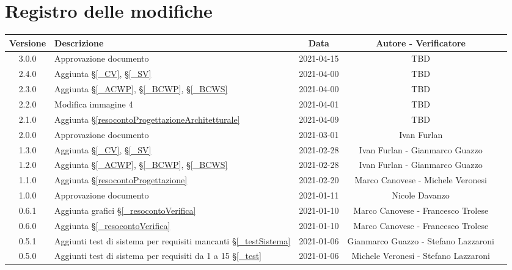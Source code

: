 \section*{Registro delle modifiche}

\begin{center}
	\begin{longtable}{|c|p{5cm}|c|c|c|}
	\hline
	\rowcolor{lighter-grayer}
	\textbf{Versione} & \textbf{Descrizione} & \textbf{Data} & \textbf{Autore - Verificatore} \\
	\hline
	\endfirsthead


	\hline
	3.0.0 & Approvazione documento & 2021-04-15 & TBD \\
	2.4.0 & Aggiunta \S\ref{_CV}, \S\ref{_SV} & 2021-04-00 & TBD \\
	2.3.0 & Aggiunta \S\ref{_ACWP}, \S\ref{_BCWP}, \S\ref{_BCWS} & 2021-04-00 & TBD \\
	2.2.0 & Modifica immagine 4  & 2021-04-01 & TBD \\
	2.1.0 & Aggiunta \S\ref{resocontoProgettazioneArchitetturale} & 2021-04-09 & TBD \\
	2.0.0 & Approvazione documento & 2021-03-01 & Ivan Furlan \\
	1.3.0 & Aggiunta \S\ref{_CV}, \S\ref{_SV} & 2021-02-28 & Ivan Furlan - Gianmarco Guazzo \\
	1.2.0 & Aggiunta \S\ref{_ACWP}, \S\ref{_BCWP}, \S\ref{_BCWS} & 2021-02-28 & Ivan Furlan - Gianmarco Guazzo \\
	1.1.0 & Aggiunta \S\ref{resocontoProgettazione} & 2021-02-20 & Marco Canovese - Michele Veronesi \\
	1.0.0 & Approvazione documento & 2021-01-11 & Nicole Davanzo \\
	0.6.1 & Aggiunta grafici \S\ref{_resocontoVerifica} & 2021-01-10 & Marco Canovese - Francesco Trolese \\
	0.6.0 & Aggiunta \S\ref{_resocontoVerifica} & 2021-01-10 & Marco Canovese - Francesco Trolese \\
	0.5.1 & Aggiunti test di sistema per requisiti mancanti \S\ref{_testSistema}& 2021-01-06 & Gianmarco Guazzo - Stefano Lazzaroni \\
	0.5.0 & Aggiunti test di sistema per requisiti da 1 a 15 \S\ref{_test}& 2021-01-06 & Michele Veronesi - Stefano Lazzaroni \\

\end{longtable}
\end{center}

